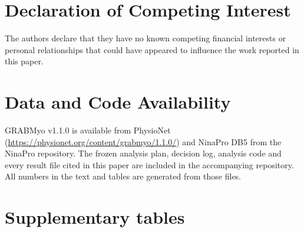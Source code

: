 \documentclass[final,5p,times,twocolumn]{elsarticle}
\begin{document}
\section*{Declaration of Competing Interest}
The authors declare that they have no known competing financial interests or personal relationships that could have appeared to influence the work reported in this paper.

\section*{Data and Code Availability}
GRABMyo v1.1.0 is available from PhysioNet (\url{https://physionet.org/content/grabmyo/1.1.0/}) and NinaPro DB5 from the NinaPro repository. The frozen analysis plan, decision log, analysis code and every result file cited in this paper are included in the accompanying repository. All numbers in the text and tables are generated from those files.

\appendix
\section{Supplementary tables}






\end{document}
